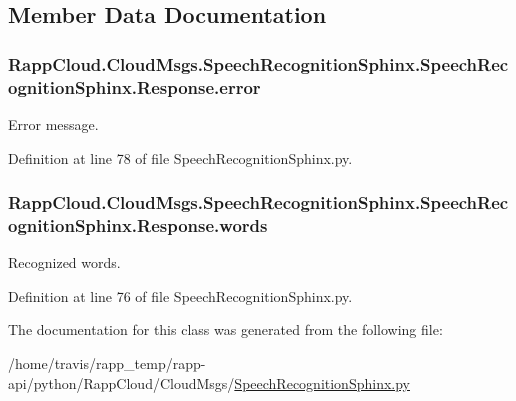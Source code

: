 \subsection{Member Data Documentation}
\hypertarget{classRappCloud_1_1CloudMsgs_1_1SpeechRecognitionSphinx_1_1SpeechRecognitionSphinx_1_1Response_aa18fa78d6b9c73f81f6dc02203306f38}{
\subsubsection[{error}]{\setlength{\rightskip}{0pt plus 5cm}Rapp\-Cloud.\-Cloud\-Msgs.\-Speech\-Recognition\-Sphinx.\-Speech\-Recognition\-Sphinx.\-Response.\-error}}\label{classRappCloud_1_1CloudMsgs_1_1SpeechRecognitionSphinx_1_1SpeechRecognitionSphinx_1_1Response_aa18fa78d6b9c73f81f6dc02203306f38}


Error message. 



Definition at line 78 of file Speech\-Recognition\-Sphinx.\-py.

\hypertarget{classRappCloud_1_1CloudMsgs_1_1SpeechRecognitionSphinx_1_1SpeechRecognitionSphinx_1_1Response_a8e6302ec83a5505353ac031237ddfb7a}{
\subsubsection[{words}]{\setlength{\rightskip}{0pt plus 5cm}Rapp\-Cloud.\-Cloud\-Msgs.\-Speech\-Recognition\-Sphinx.\-Speech\-Recognition\-Sphinx.\-Response.\-words}}\label{classRappCloud_1_1CloudMsgs_1_1SpeechRecognitionSphinx_1_1SpeechRecognitionSphinx_1_1Response_a8e6302ec83a5505353ac031237ddfb7a}


Recognized words. 



Definition at line 76 of file Speech\-Recognition\-Sphinx.\-py.



The documentation for this class was generated from the following file\-:\begin{DoxyCompactItemize}
\item 
/home/travis/rapp\-\_\-temp/rapp-\/api/python/\-Rapp\-Cloud/\-Cloud\-Msgs/\hyperlink{SpeechRecognitionSphinx_8py}{Speech\-Recognition\-Sphinx.\-py}\end{DoxyCompactItemize}
